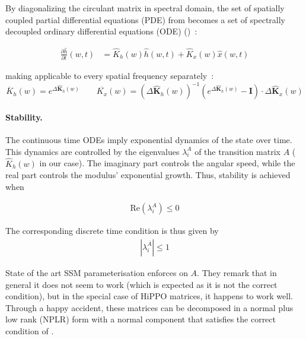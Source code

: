 By diagonalizing the circulant matrix in spectral domain, the set of spatially coupled partial differential equations (PDE) from  becomes a set of spectrally decoupled ordinary differential equations (ODE) ()~:

\begin{minipage}[t]{.45\linewidth}
  \begin{subequations}
    \begin{align}
    \label{eq:conv_ssm_continuous_spectral}
      \frac{\partial \widehat{h}}{\partial t}(w,t) &= \widehat{K}_h(w) \widehat{h}(w, t) + \widehat{K}_x(w) \widehat{x}(w, t)
    \end{align}
  \end{subequations}
\end{minipage}%

making  applicable to every spatial frequency separately~:
\begin{equation}
\label{eq:zoh_spectral}
\overline{K}_h(w) = e^{\Delta \bm{\widehat{K}}_h(w)}
\qquad
\overline{K_x}(w) = (\Delta \bm{\widehat{K}}_h(w))^{-1} (e^{\Delta \bm{\widehat{K}}_h(w)} - \bm{I}) \cdot \Delta \bm{\widehat{K}}_x(w)
\end{equation}

\paragraph{Stability.} The continuous time ODEs imply exponential dynamics of the state over time. This dynamics are controlled by the eigenvalues $\lambda^A_i$ of the transition matrix $A$ ($\widehat{K}_h(w)$ in our case). The imaginary part controls the angular speed, while the real part controls the modulus' exponential growth. Thus, stability is achieved when

\begin{align}
    \label{eq:stability}
    \mathrm{Re}(\lambda^A_i) \leq 0
\end{align}

The corresponding discrete time condition is thus given by
\begin{align}
    \label{eq:discrete_stability}
    |\lambda^{\overline{A}}_i| \leq 1
\end{align}

State of the art SSM parameterisation enforces  on $A$. They remark that in general it does not seem to work (which is expected as it is not the correct condition), but in the special case of HiPPO matrices, it happens to work well. Through a happy accident, these matrices can be decomposed in a normal plus low rank (NPLR) form with a normal component that satisfies the correct condition of .

